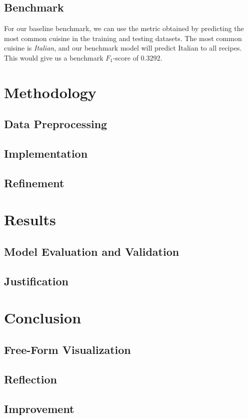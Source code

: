 \documentclass[12pt]{article}
\begin{document}
\subsection{Benchmark}
For our baseline benchmark, we can use the metric obtained by predicting the most common cuisine in the training and testing datasets. The most common cuisine is \textit{Italian}, and our benchmark model will predict Italian to all recipes. This would give us a benchmark $F_1$-score of $0.3292$.

\section{Methodology}
\subsection{Data Preprocessing}

\subsection{Implementation}

\subsection{Refinement}

\section{Results}
\subsection{Model Evaluation and Validation}

\subsection{Justification}

\section{Conclusion}
\subsection{Free-Form Visualization}

\subsection{Reflection}

\subsection{Improvement}
\end{document}
